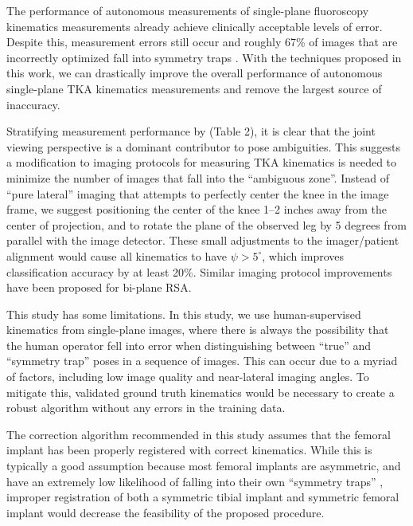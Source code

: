 The performance of autonomous measurements of single-plane fluoroscopy kinematics measurements already achieve clinically acceptable levels of error.
Despite this, measurement errors still occur and roughly 67\% of images that are incorrectly optimized fall into symmetry traps \cite{jensenJointTrackMachine2023,brobergValidationMachineLearning2023}.
With the techniques proposed in this work, we can drastically improve the overall performance of autonomous single-plane TKA kinematics measurements and remove the largest source of inaccuracy.


Stratifying measurement performance by  (Table 2), it is clear that the joint viewing perspective is a dominant contributor to pose ambiguities.
This suggests a modification to imaging protocols for measuring TKA kinematics is needed to minimize the number of images that fall into the “ambiguous zone”.
Instead of “pure lateral” imaging that attempts to perfectly center the knee in the image frame, we suggest positioning the center of the knee 1–2 inches away from the center of projection, and to rotate the plane of the observed leg by 5 degrees from parallel with the image detector.
These small adjustments to the imager/patient alignment would cause all kinematics to have $\psi > 5^{\circ}$, which improves classification accuracy by at least 20\%. Similar imaging protocol improvements have been proposed for bi-plane RSA\cite{niesenReorientingTibialBaseplate2020}.

This study has some limitations. In this study, we use human-supervised kinematics from single-plane images, where there is always the possibility that the human operator fell into error when distinguishing between “true” and “symmetry trap” poses in a sequence of images. This can occur due to a myriad of factors, including low image quality and near-lateral imaging angles. To mitigate this, validated ground truth kinematics would be necessary to create a robust algorithm without any errors in the training data.

The correction algorithm recommended in this study assumes that the femoral implant has been properly registered with correct kinematics. While this is typically a good assumption because most femoral implants are asymmetric, and have an extremely low likelihood of falling into their own “symmetry traps” \cite{jensenJointTrackMachine2023}, improper registration of both a symmetric tibial implant and symmetric femoral implant would decrease the feasibility of the proposed procedure.

